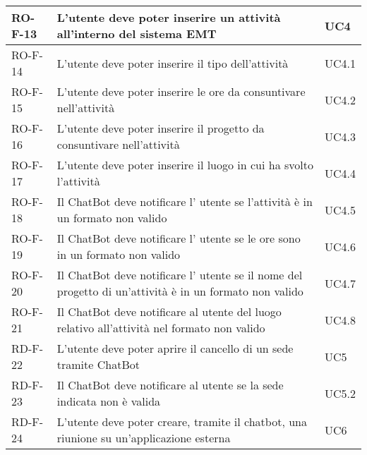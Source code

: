 \begin{center}
\begin{tabular}{ | m{8em} | m{18em} | m{12em} | }
\hline
RO-F-13&L’utente deve poter inserire un attività all’interno del sistema EMT &UC4 \\
\hline
RO-F-14&L’utente deve poter inserire il tipo dell’attività &UC4.1 \\
\hline
RO-F-15&L’utente deve poter inserire le ore da consuntivare nell’attività &UC4.2 \\
\hline  
RO-F-16&L’utente deve poter inserire il progetto da consuntivare nell’attività &UC4.3 \\
\hline
RO-F-17&L’utente deve poter inserire il luogo in cui ha svolto l’attività &UC4.4 \\
\hline
RO-F-18&Il ChatBot deve notificare l' utente se l'attività è in un formato non valido &UC4.5 \\
\hline
RO-F-19&Il ChatBot deve notificare l' utente se le ore sono in un formato non valido &UC4.6 \\
\hline
RO-F-20&Il ChatBot deve notificare l' utente se il nome del progetto di un'attività è in un formato non valido &UC4.7 \\
\hline
RO-F-21&Il ChatBot deve notificare al utente del luogo relativo all’attività nel formato non valido &UC4.8 \\
\hline
RD-F-22&L’utente deve poter aprire il cancello di un sede tramite ChatBot &UC5 \\
\hline
RD-F-23&Il ChatBot deve notificare al utente se la sede indicata non è valida &UC5.2 \\
\hline
RD-F-24&L’utente deve poter creare, tramite il chatbot, una riunione su un'applicazione esterna &UC6 \\
\hline
\end{tabular}
\newpage


\end{center}
